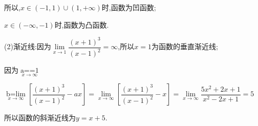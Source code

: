 所以,$x \in ( - 1,1) \cup (1, + \infty )$时,函数为凹函数;

$x \in ( - \infty , - 1)$时,函数为凸函数.

(2)渐近线:因为$\lim\limits_{x \to 1}  \dfrac{{{{(x + 1)}^3}}}{{{{(x - 1)}^2}}} = \infty $,所以$x = 1$为函数的垂直渐近线;

因为$\mathop {a = \mathop {\lim }\limits_{x \to \infty } \dfrac{{\dfrac{{{{(x + 1)}^3}}}{{{{(x - 1)}^2}}}}}{x} = 1}\limits_{x \to \infty } $

$\mathop {b = \lim }\limits_{x \to \infty } [\dfrac{{{{(x + 1)}^3}}}{{{{(x - 1)}^2}}} - ax] = \mathop {\lim }\limits_{x \to \infty } [\dfrac{{{{(x + 1)}^3}}}{{{{(x - 1)}^2}}} - x] = \mathop {\lim }\limits_{x \to \infty } \dfrac{{5{x^2} + 2x + 1}}{{{x^2} - 2x + 1}} = 5$

所以函数的斜渐近线为$y = x + 5$.

































